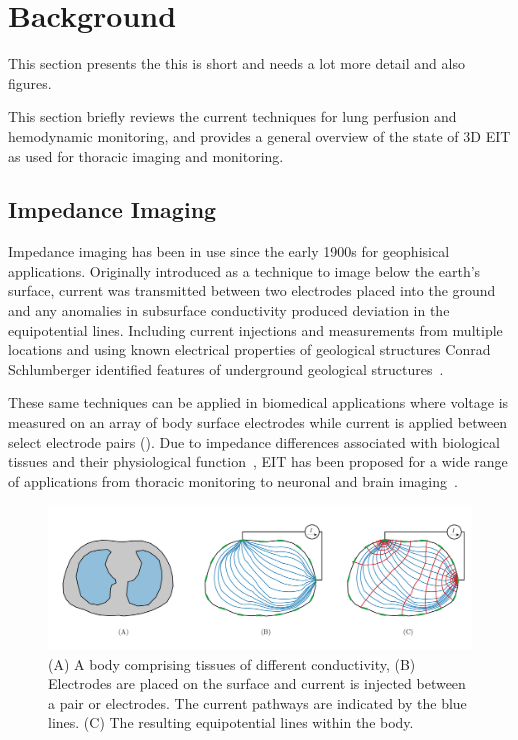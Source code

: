 \chapter{Background}
This section presents the 
this is short and needs a lot more detail and also figures.

This section briefly reviews the current techniques for lung perfusion and hemodynamic
monitoring, and provides a general overview 
of the state of 3D EIT as used for thoracic imaging and monitoring.


\section{Impedance Imaging}
\label{sec:impedance_imaging}
Impedance imaging has been in use since the early 1900s for geophisical applications.  
Originally introduced as a technique to image below the earth’s surface, 
current was transmitted between two electrodes placed into the ground and any 
anomalies in subsurface conductivity produced deviation 
in the equipotential lines. 
Including current injections and measurements from multiple locations and using known 
electrical properties of geological structures Conrad Schlumberger identified
features of underground geological structures~\parencite{allaud_schlumberger_1977}.

These same techniques can be applied in biomedical applications where
voltage is measured on an array of body surface electrodes 
while current is applied between select electrode pairs (). 
Due to impedance differences associated with biological tissues and their physiological 
function~\parencite{Geddes1967,McAdams1995},
EIT has been proposed for a wide range of applications from thoracic monitoring to neuronal and 
brain imaging~\parencite{Holder1992,Frerichs2016}. 

\begin{figure}
   \includegraphics[width=\textwidth]{chapter2-background/imgs/current_and_equipotential_lines.pdf}
   \caption[Current and Equipotential lines]{\label{fig:cur_equip_line} 
   (A) A body comprising tissues of different conductivity, (B) Electrodes are placed on the surface 
   and current is injected between a pair or electrodes. The current pathways are indicated 
   by the blue lines. (C) The resulting equipotential lines within the body.}
\end{figure}

